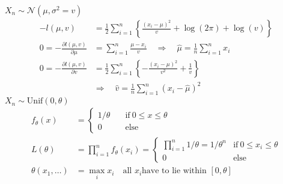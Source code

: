 \begin{examplesection}[Examples]
    $X_n\sim\mathcal{N}(\mu,\sigma^2=v)$
    \noindent\begin{align*}
        -l(\mu,v)                                & =\frac12\sum_{i=1}^n\left\{\frac{{(x_i-\mu)}^2}v+\log(2\pi)+\log(v)\right\}         \\
        0=-\frac{\partial l(\mu,v)}{\partial\mu} & =\sum_{i=1}^n\frac{\mu-x_i}v\quad\Rightarrow\quad \hat{\mu}=\frac1n\sum_{i=1}^n x_i \\
        0=-\frac{\partial l(\mu,v)}{\partial v}  & =\frac12\sum_{i=1}^n\left\{-\frac{{(x_i-\mu)}^2}{v^2}+\frac1v\right\}               \\
                                                 & \Rightarrow\quad\hat{v}=\frac1n\sum_{i=1}^n{(x_i-\hat{\mu})}^2
    \end{align*}
    $X_n\sim \mathrm{Unif}(0,\theta)$
    \noindent\begin{align*}
        f_\theta(x)        & =\begin{cases}
                                  1/\theta & \quad\mathrm{if~}0\leq x\leq\theta \\
                                  0        & \quad\mathrm{else}
                              \end{cases}                                                  \\
        L(\theta)          & =\prod_{i=1}^n f_\theta(x_i)=\begin{cases}
                                                              \prod_{i=1}^n1/\theta=1/\theta^n & \mathrm{if~}0\leq x_i\leq\theta \\
                                                              0                                & \mathrm{else}
                                                          \end{cases} \\
        \theta(x_1,\ldots) & =\max_i x_i\quad \text{all } x_i \text{have to lie within } [0,\theta]
    \end{align*}
\end{examplesection}

